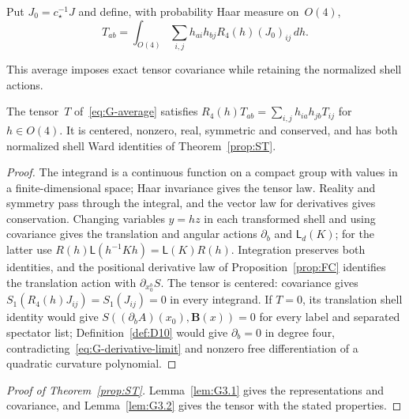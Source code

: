 Put $J_0=c_\star^{-1}J$ and define, with probability Haar measure on~$O(4)$,
\begin{equation}\label{eq:G-average}
T_{ab}=\int_{O(4)}\sum_{i,j}h_{ai}h_{bj}R_4(h)(J_0)_{ij}\,dh.
\end{equation}
\begin{samepage}
This average imposes exact tensor covariance while retaining the normalized shell actions.
\begin{lemma}\label{lem:G3.2}
The tensor~$T$ of~\eqref{eq:G-average} satisfies $R_4(h)T_{ab}=\sum_{i,j}h_{ia}h_{jb}T_{ij}$ for $h\in O(4)$. It is centered, nonzero, real, symmetric and conserved, and has both normalized shell Ward identities of Theorem~\ref{prop:ST}.
\end{lemma}
\end{samepage}
\begin{proof}
The integrand is a continuous function on a compact group with values in a finite-dimensional space; Haar invariance gives the tensor law. Reality and symmetry pass through the integral, and the vector law for derivatives gives conservation. Changing variables $y=hz$ in each transformed shell and using covariance gives the translation and angular actions $\partial_b$ and $\mathsf L_d(K)$; for the latter use $R(h)\mathsf L(h^{-1}Kh)=\mathsf L(K)R(h)$. Integration preserves both identities, and the positional derivative law of Proposition~\ref{prop:FC} identifies the translation action with $\partial_{x_0^b}S$. The tensor is centered: covariance gives $S_1(R_4(h)J_{ij})=S_1(J_{ij})=0$ in every integrand. If $T=0$, its translation shell identity would give $S((\partial_bA)(x_0),\boldsymbol B(x))=0$ for every label and separated spectator list; Definition~\ref{def:D10} would give $\partial_b=0$ in degree four, contradicting~\eqref{eq:G-derivative-limit} and nonzero free differentiation of a quadratic curvature polynomial.
\end{proof}
\begin{proof}[Proof of Theorem~\ref{prop:ST}]
Lemma~\ref{lem:G3.1} gives the representations and covariance, and Lemma~\ref{lem:G3.2} gives the tensor with the stated properties.
\end{proof}

